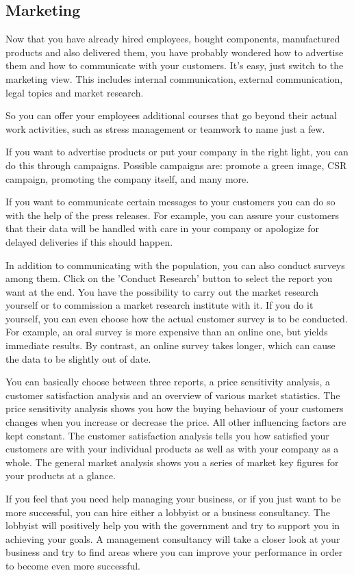 \subsection{Marketing} \label{marketing_manual}
Now that you have already hired employees, bought components, manufactured products and also delivered them, you have probably wondered how to advertise them and how to communicate with your customers. It's easy, just switch to the marketing view. This includes internal communication, external communication, legal topics and market research.

So you can offer your employees additional courses that go beyond their actual work activities, such as stress management or teamwork to name just a few.

If you want to advertise products or put your company in the right light, you can do this through campaigns. Possible campaigns are: promote a green image, CSR campaign, promoting the company itself, and many more.

If you want to communicate certain messages to your customers you can do so with the help of the press releases. For example, you can assure your customers that their data will be handled with care in your company or apologize for delayed deliveries if this should happen.

In addition to communicating with the population, you can also conduct surveys among them. Click on the 'Conduct Research' button to select the report you want at the end. You have the possibility to carry out the market research yourself or to commission a market research institute with it. If you do it yourself, you can even choose how the actual customer survey is to be conducted. For example, an oral survey is more expensive than an online one, but yields immediate results.  By contrast, an online survey takes longer, which can cause the data to be slightly out of date.

You can basically choose between three reports, a price sensitivity analysis, a customer satisfaction analysis and an overview of various market statistics. The price sensitivity analysis shows you how the buying behaviour of your customers changes when you increase or decrease the price. All other influencing factors are kept constant. The customer satisfaction analysis tells you how satisfied your customers are with your individual products as well as with your company as a whole. The general market analysis shows you a series of market key figures for your products at a glance. 

If you feel that you need help managing your business, or if you just want to be more successful, you can hire either a lobbyist or a business consultancy. The lobbyist will positively help you with the government and try to support you in achieving your goals. 
A management consultancy will take a closer look at your business and try to find areas where you can improve your performance in order to become even more successful.